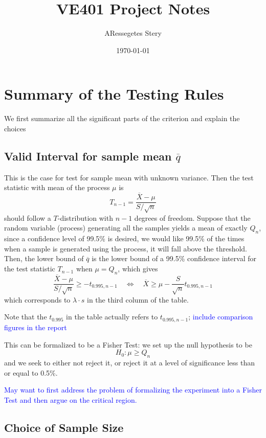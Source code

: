 \documentclass{article}
\title{VE401 Project Notes}
\author{ARessegetes Stery}
\date{\today}
\def\unf#1{\textcolor{blue}{#1}}
\begin{document}
\maketitle

\begin{spacing}{2}
    \tableofcontents
\end{spacing}

\newpage
\section{Summary of the Testing Rules}

We first summarize all the significant parts of the criterion and explain the choices

\subsection{Valid Interval for sample mean $\overline{q}$}

This is the case for test for sample mean with unknown variance. Then the test statistic with mean of the process $\mu$ is 
$$
T_{n-1} = \dfrac{\overline{X} - \mu}{S/\sqrt{n}}
$$
should follow a $T$-distribution with $n-1$ degrees of freedom. Suppose that the random variable (process) generating all the samples yields a mean of exactly $Q_n$, since a confidence level of 99.5\% is desired, we would like 99.5\% of the times when a sample is generated using the process, it will fall above the threshold. Then, the lower bound of $\overline{q}$ is the lower bound of a 99.5\% confidence interval for the test statistic $T_{n-1}$ when $\mu = Q_n$, which gives
$$
\dfrac{\overline{X} - \mu}{S/\sqrt{n}} \geq -t_{0.995, n-1} \quad\Leftrightarrow\quad \overline{X}\geq\mu-\dfrac{S}{\sqrt{n}}t_{0.995, n-1}
$$ 
which corresponds to $\lambda\cdot s$ in the third column of the table. 

Note that the $t_{0.995}$ in the table actually refers to $t_{0.995, n-1}$; \unf{include comparison figures in the report}

This can be formalized to be a Fisher Test: we set up the null hypothesis to be
$$
H_0: \mu \geq Q_n
$$
and we seek to either not reject it, or reject it at a level of significance less than or equal to 0.5\%. 

\unf{May want to first address the problem of formalizing the experiment into a Fisher Test and then argue on the critical region.}

\subsection{Choice of Sample Size}
\end{document}
